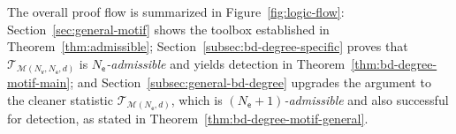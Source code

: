 \documentclass[letterpaper,11pt]{article}
\theoremstyle{definition}
\newcommand{\sfe}{{\mathsf{e}}}
\begin{document}
The overall proof flow is summarized in Figure~\ref{fig:logic-flow}:
Section~\ref{sec:general-motif} shows the toolbox
established in  Theorem~\ref{thm:admissible}; Section~\ref{subsec:bd-degree-specific} proves that
$\mathcal{T}_{\mathcal{M}(N_{\mathsf v},N_{\mathsf e},d)}$ is \emph{$N_\sfe$-admissible} and yields detection in Theorem~\ref{thm:bd-degree-motif-main}; and
Section~\ref{subsec:general-bd-degree} upgrades the argument to the cleaner statistic
$\mathcal{T}_{\mathcal{M}(N_{\mathsf e},d)}$, which is \emph{$(N_\sfe{+}1)$-admissible} and also successful for detection, as stated in Theorem~\ref{thm:bd-degree-motif-general}.





\end{document}
